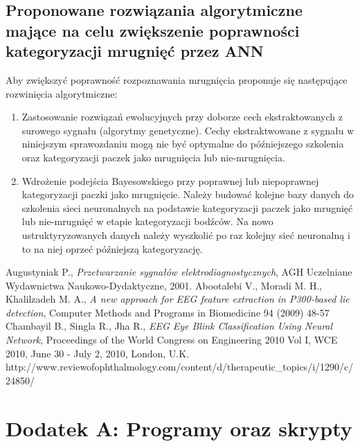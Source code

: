 \documentclass{article}
\begin{document}
        \subsection{Proponowane rozwiązania algorytmiczne mające na celu zwiększenie poprawności kategoryzacji mrugnięć przez ANN}
            Aby zwiększyć poprawność rozpoznawania mrugnięcia proponuje się następujące rozwinięcia algorytmiczne:
            \begin{enumerate}
                \item Zastosowanie rozwiązań ewolucyjnych przy doborze cech ekstraktowanych z surowego sygnału (algorytmy genetyczne). Cechy ekstraktwowane z sygnału w niniejszym sprawozdaniu mogą nie być optymalne do późniejszego szkolenia oraz kategoryzacji paczek jako mrugnięcia lub nie-mrugnięcia.
                \item Wdrożenie podejścia Bayesowskiego przy poprawnej lub niepoprawnej kategoryzacji paczki jako mrugnięcie. Należy budować kolejne bazy danych do szkolenia sieci neuronalnych na podstawie kategoryzacji paczek jako mrugnięć lub nie-mrugnięć w etapie kategoryzacji bodźców. Na nowo ustruktyryzowanych danych należy wyszkolić po raz kolejny sieć neuronalną i to na niej oprzeć późniejszą kategoryzację.
            \end{enumerate}




    \newpage
    \begin{thebibliography}{50}
        \bibitem{} Augustyniak P., \emph{Przetwarzanie sygnałów elektrodiagnostycznych}, AGH Uczelniane Wydawnictwa Naukowo-Dydaktyczne, 2001.
        \bibitem{} Abootalebi V., Moradi M. H., Khalilzadeh M. A., \emph{A new approach for EEG feature extraction in P300-based lie detection}, Computer Methods and Programs in Biomedicine 94 (2009) 48-57
        \bibitem{} Chambayil B., Singla R., Jha R., \emph{EEG Eye Blink Classification Using Neural Network}, Proceedings of the World Congress on Engineering 2010 Vol I, WCE 2010, June 30 - July 2, 2010, London, U.K.
        \bibitem{} http://www.reviewofophthalmology.com/content/d/therapeutic\_topics/i/1290/c/24850/
    \end{thebibliography}

    \newpage
    \section*{Dodatek A: Programy oraz skrypty}
\end{document}
